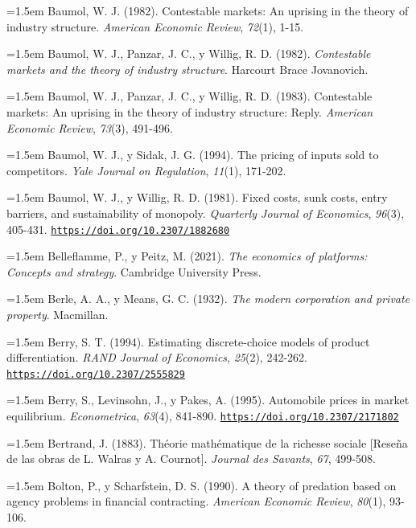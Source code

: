 \documentclass[10pt,a4paper]{article}
\begin{document}
\noindent\hangindent=1.5em Baumol, W. J. (1982). Contestable markets: An uprising in the theory of industry structure. \textit{American Economic Review}, \textit{72}(1), 1-15.

\noindent\hangindent=1.5em Baumol, W. J., Panzar, J. C., y Willig, R. D. (1982). \textit{Contestable markets and the theory of industry structure}. Harcourt Brace Jovanovich.

\noindent\hangindent=1.5em Baumol, W. J., Panzar, J. C., y Willig, R. D. (1983). Contestable markets: An uprising in the theory of industry structure: Reply. \textit{American Economic Review}, \textit{73}(3), 491-496.

\noindent\hangindent=1.5em Baumol, W. J., y Sidak, J. G. (1994). The pricing of inputs sold to competitors. \textit{Yale Journal on Regulation}, \textit{11}(1), 171-202.

\noindent\hangindent=1.5em Baumol, W. J., y Willig, R. D. (1981). Fixed costs, sunk costs, entry barriers, and sustainability of monopoly. \textit{Quarterly Journal of Economics}, \textit{96}(3), 405-431. \href{https://doi.org/10.2307/1882680}{\nolinkurl{https://doi.org/10.2307/1882680}}

\noindent\hangindent=1.5em Belleflamme, P., y Peitz, M. (2021). \textit{The economics of platforms: Concepts and strategy}. Cambridge University Press.

\noindent\hangindent=1.5em Berle, A. A., y Means, G. C. (1932). \textit{The modern corporation and private property}. Macmillan.

\noindent\hangindent=1.5em Berry, S. T. (1994). Estimating discrete-choice models of product differentiation. \textit{RAND Journal of Economics}, \textit{25}(2), 242-262. \href{https://doi.org/10.2307/2555829}{\nolinkurl{https://doi.org/10.2307/2555829}}

\noindent\hangindent=1.5em Berry, S., Levinsohn, J., y Pakes, A. (1995). Automobile prices in market equilibrium. \textit{Econometrica}, \textit{63}(4), 841-890. \href{https://doi.org/10.2307/2171802}{\nolinkurl{https://doi.org/10.2307/2171802}}

\noindent\hangindent=1.5em Bertrand, J. (1883). Théorie mathématique de la richesse sociale [Reseña de las obras de L. Walras y A. Cournot]. \textit{Journal des Savants}, \textit{67}, 499-508.

\noindent\hangindent=1.5em Bolton, P., y Scharfstein, D. S. (1990). A theory of predation based on agency problems in financial contracting. \textit{American Economic Review}, \textit{80}(1), 93-106.
\end{document}
